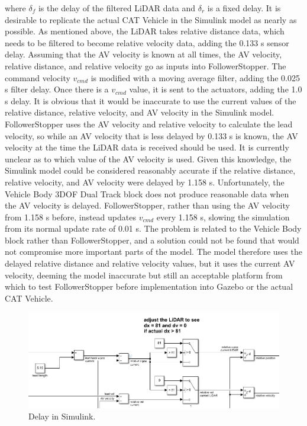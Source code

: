 \documentclass[conference]{IEEEtran}
\begin{document}
where $\delta_f$ is the delay of the filtered LiDAR data and $\delta_r$ is a fixed delay. It is desirable to replicate the actual CAT Vehicle in the Simulink model as nearly as possible. As mentioned above, the LiDAR takes relative distance data, which needs to be filtered to become relative velocity data, adding the 0.133 s sensor delay. Assuming that the AV velocity is known at all times, the AV velocity, relative distance, and relative velocity go as inputs into FollowerStopper. The command velocity $v_{cmd}$ is modified with a moving average filter, adding the 0.025 s filter delay. Once there is a $v_{cmd}$ value, it is sent to the actuators, adding the 1.0 s delay. It is obvious that it would be inaccurate to use the current values of the relative distance, relative velocity, and AV velocity in the Simulink model. FollowerStopper uses the AV velocity and relative velocity to calculate the lead velocity, so while an AV velocity that is less delayed by 0.133 s is known, the AV velocity at the time the LiDAR data is received should be used. It is currently unclear as to which value of the AV velocity is used. Given this knowledge, the Simulink model could be considered reasonably accurate if the relative distance, relative velocity, and AV velocity were delayed by 1.158 s. Unfortunately, the Vehicle Body 3DOF Dual Track block does not produce reasonable data when the AV velocity is delayed. FollowerStopper, rather than using the AV velocity from 1.158 s before, instead updates $v_{cmd}$ every 1.158 s, slowing the simulation from its normal update rate of 0.01 s. The problem is related to the Vehicle Body block rather than FollowerStopper, and a solution could not be found that would not compromise more important parts of the model. The model therefore uses the delayed relative distance and relative velocity values, but it uses the current AV velocity, deeming the model inaccurate but still an acceptable platform from which to test FollowerStopper before implementation into Gazebo or the actual CAT Vehicle.

\begin{figure}[htbp]
\centerline{\includegraphics[width=3.5 in]{delay.png}}
\caption{Delay in Simulink.}
\label{fig2}
\end{figure}
\end{document}
